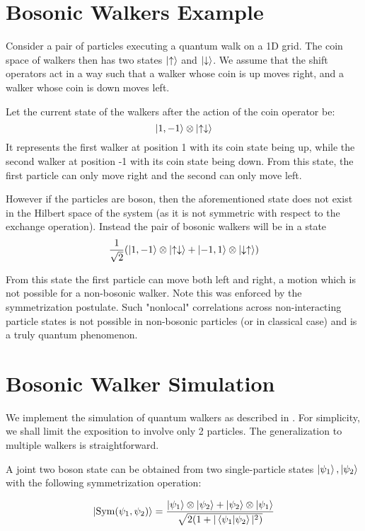 \section{Bosonic Walkers Example}
\label{apx:example}
Consider a pair of particles executing a quantum walk on a 1D grid.
The coin space of walkers then has two states $\ket{\uparrow}$ and $\ket{\downarrow}$. We assume that the shift operators act in a way such that a walker whose coin is up moves right, and a walker whose coin is down moves left.

Let the current state of the walkers after the action of the coin operator be: 
$$\ket{1,-1}\otimes\ket{\uparrow \downarrow}$$
It represents the first walker at position 1 with its coin state being up, while the second walker at position -1 with its coin state being down. From this state, the first particle can only move right and the second can only move left.

However if the particles are boson, then the aforementioned state does not exist in the Hilbert space of the system (as it is not symmetric with respect to the exchange operation). Instead the pair of bosonic walkers will be in a state $$ \frac{1}{\sqrt{2}}(\ket{1,-1}\otimes\ket{\uparrow \downarrow} + \ket{-1,1}\otimes\ket{\downarrow \uparrow})$$

From this state the first particle can move both left and right, a motion which is not possible for a non-bosonic walker. Note this was enforced by the symmetrization postulate. Such "nonlocal" correlations across non-interacting particle states is not possible in non-bosonic particles (or in classical case) and is a truly quantum phenomenon. %

\section{Bosonic Walker Simulation}
\label{apx:bosonic}
We implement the simulation of quantum walkers as described in \cite{gamble2010twoparticle,Rigovacca_2016}. For simplicity, we shall limit the exposition to involve only 2 particles. The generalization to multiple walkers is straightforward.

A joint two boson state can be obtained from two single-particle states $\ket{\psi_1}, \ket{\psi_2}$ with the following symmetrization operation:

$$
\ket{\text{Sym}(\psi_1,\psi_2)} = \dfrac{\ket{\psi_1}\otimes\ket{\psi_2} + \ket{\psi_2}\otimes\ket{\psi_1}}{\sqrt{2(1+ |\bra{\psi_1}\ket{\psi_2}|^2)}}
$$


